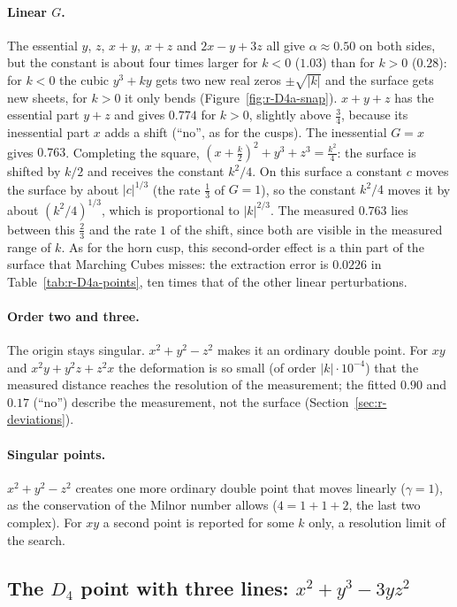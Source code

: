 \documentclass[12pt, a4paper]{article}
\theoremstyle{plain}
\theoremstyle{definition}
\theoremstyle{remark}
\theoremstyle{definition}
\begin{document}
\paragraph{Linear $G$.} The essential $y$, $z$, $x+y$, $x+z$ and $2x-y+3z$ all give
$\alpha\approx0.50$ on both sides, but the constant is about four times larger for
$k<0$ ($1.03$) than for $k>0$ ($0.28$): for $k<0$ the cubic $y^3+ky$ gets two new
real zeros $\pm\sqrt{|k|}$ and the surface gets new sheets, for $k>0$ it only bends
(Figure~\ref{fig:r-D4a-snap}). $x+y+z$ has the essential part $y+z$ and gives
$0.774$ for $k>0$, slightly above $\tfrac34$, because its inessential part $x$ adds a
shift (``no'', as for the cusps).
The inessential $G=x$ gives $0.763$. Completing the square,
$(x+\tfrac k2)^2+y^3+z^3=\tfrac{k^2}{4}$: the surface is shifted by $k/2$ and receives
the constant $k^2/4$. On this surface a constant $c$ moves the surface by about
$|c|^{1/3}$ (the rate $\tfrac13$ of $G=1$), so the constant $k^2/4$ moves it by about
$(k^2/4)^{1/3}$, which is proportional to $|k|^{2/3}$. The measured $0.763$ lies
between this $\tfrac23$ and the rate $1$ of the shift, since both are visible in the
measured range of $k$. As for the horn cusp, this second-order effect is a thin
part of the surface that Marching Cubes misses: the extraction error is $0.0226$ in
Table~\ref{tab:r-D4a-points}, ten times that of the other linear perturbations.

\paragraph{Order two and three.} The origin stays singular. $x^2+y^2-z^2$ makes it
an ordinary double point. For $xy$ and $x^2y+y^2z+z^2x$ the deformation is so small
(of order $|k|\cdot10^{-4}$) that the measured distance reaches the resolution of the
measurement; the fitted $0.90$ and $0.17$ (``no'') describe the measurement, not
the surface (Section~\ref{sec:r-deviations}).

\paragraph{Singular points.} $x^2+y^2-z^2$ creates one more ordinary double point
that moves linearly ($\gamma=1$), as the conservation of the Milnor number allows
($4=1+1+2$, the last two complex). For $xy$ a second point is reported for some $k$
only, a resolution limit of the search.
\clearpage

\subsection{The $D_4$ point with three lines: $x^2+y^3-3yz^2$}
\label{sec:r-D4b}
\end{document}
